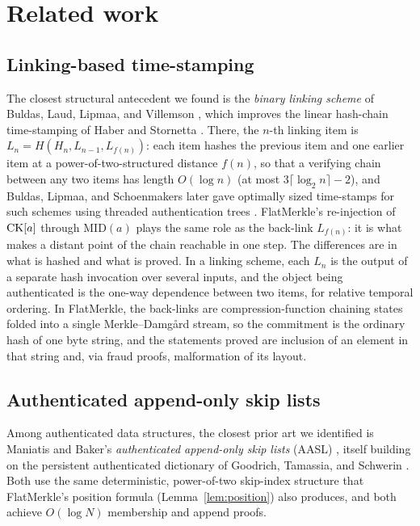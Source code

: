 \section{Related work}
\label{sec:related-work}

\subsection{Linking-based time-stamping}

The closest structural antecedent we found is the \emph{binary linking
scheme} of Buldas, Laud, Lipmaa, and Villemson \citep{buldas1998}, which
improves the linear hash-chain time-stamping of Haber and Stornetta
\citep{haber1991}. There, the $n$-th linking item is $L_n = H(H_n, L_{n-1},
L_{f(n)})$: each item hashes the previous item and one earlier item at a
power-of-two-structured distance $f(n)$, so that a verifying chain between
any two items has length $O(\log n)$ (at most $3\lceil \log_2 n\rceil - 2$),
and Buldas, Lipmaa, and Schoenmakers later gave optimally sized
time-stamps for such schemes using threaded authentication trees
\citep{buldas2000}. FlatMerkle's re-injection of $\mathrm{CK}[a]$ through
$\mathrm{MID}(a)$ plays the same role as the back-link $L_{f(n)}$: it is
what makes a distant point of the chain reachable in one step. The
differences are in what is hashed and what is proved. In a linking scheme,
each $L_n$ is the output of a separate hash invocation over several
inputs, and the object being authenticated is the one-way dependence
between two items, for relative temporal ordering. In FlatMerkle, the
back-links are compression-function chaining states folded into a single
Merkle--Damg\aa rd stream, so the commitment is the ordinary hash of one
byte string, and the statements proved are inclusion of an element in that
string and, via fraud proofs, malformation of its layout.

\subsection{Authenticated append-only skip lists}

Among authenticated data structures, the closest prior art we identified
is Maniatis and Baker's
\emph{authenticated append-only skip lists} (AASL)
\citep{maniatis2003}, itself building on the persistent authenticated
dictionary of Goodrich, Tamassia, and Schwerin
\citep{goodrich2001}. Both use the same deterministic,
power-of-two skip-index structure that FlatMerkle's position formula
(Lemma~\ref{lem:position}) also produces, and both achieve $O(\log N)$
membership and append proofs.

